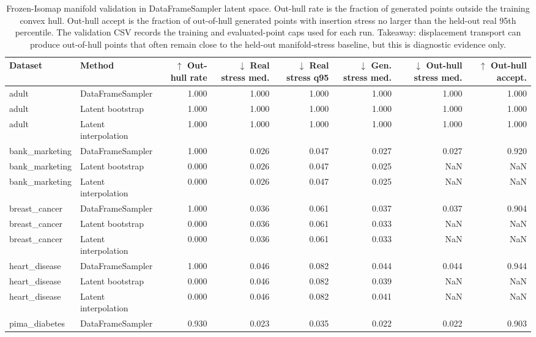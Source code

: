 \begin{table}
\caption{Frozen-Isomap manifold validation in DataFrameSampler latent space. Out-hull rate is the fraction of generated points outside the training convex hull. Out-hull accept is the fraction of out-of-hull generated points with insertion stress no larger than the held-out real 95th percentile. The validation CSV records the training and evaluated-point caps used for each run. Takeaway: displacement transport can produce out-of-hull points that often remain close to the held-out manifold-stress baseline, but this is diagnostic evidence only.}
\label{tab:manifold-validation}
\begin{adjustbox}{max width=\textwidth}
\begin{tabular}{llrrrrrr}
\toprule
Dataset & Method & $\uparrow$ Out-hull rate & $\downarrow$ Real stress med. & $\downarrow$ Real stress q95 & $\downarrow$ Gen. stress med. & $\downarrow$ Out-hull stress med. & $\uparrow$ Out-hull accept. \\
\midrule
adult & DataFrameSampler & 1.000 & 1.000 & 1.000 & 1.000 & 1.000 & 1.000 \\
adult & Latent bootstrap & 1.000 & 1.000 & 1.000 & 1.000 & 1.000 & 1.000 \\
adult & Latent interpolation & 1.000 & 1.000 & 1.000 & 1.000 & 1.000 & 1.000 \\
bank\_marketing & DataFrameSampler & 1.000 & 0.026 & 0.047 & 0.027 & 0.027 & 0.920 \\
bank\_marketing & Latent bootstrap & 0.000 & 0.026 & 0.047 & 0.025 & NaN & NaN \\
bank\_marketing & Latent interpolation & 0.000 & 0.026 & 0.047 & 0.025 & NaN & NaN \\
breast\_cancer & DataFrameSampler & 1.000 & 0.036 & 0.061 & 0.037 & 0.037 & 0.904 \\
breast\_cancer & Latent bootstrap & 0.000 & 0.036 & 0.061 & 0.033 & NaN & NaN \\
breast\_cancer & Latent interpolation & 0.000 & 0.036 & 0.061 & 0.033 & NaN & NaN \\
heart\_disease & DataFrameSampler & 1.000 & 0.046 & 0.082 & 0.044 & 0.044 & 0.944 \\
heart\_disease & Latent bootstrap & 0.000 & 0.046 & 0.082 & 0.039 & NaN & NaN \\
heart\_disease & Latent interpolation & 0.000 & 0.046 & 0.082 & 0.041 & NaN & NaN \\
pima\_diabetes & DataFrameSampler & 0.930 & 0.023 & 0.035 & 0.022 & 0.022 & 0.903 \\

\end{tabular}
\end{adjustbox}
\end{table}
